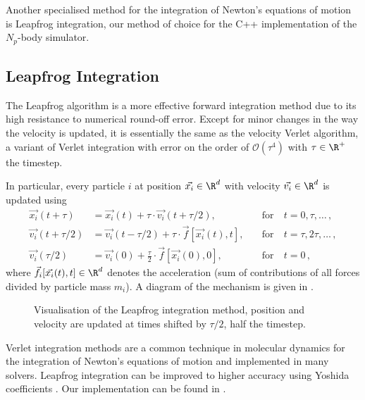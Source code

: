 Another specialised method for the integration of Newton's equations of motion is Leapfrog integration, our method of choice for the C++ implementation of the $N_p$-body simulator.

\subsection{Leapfrog Integration}
The Leapfrog algorithm is a more effective forward integration method due to its high resistance to numerical round-off error.
Except for minor changes in the way the velocity is updated, it is essentially the same as the velocity Verlet algorithm, a variant of Verlet integration with error on the order of $\mathcal{O}(\tau^4)$ with $\tau \in \R^+$ the timestep.

In particular, every particle $i$ at position $\vec{x_i} \in \R^d$ with velocity $\vec{v_i} \in \R^d$ is updated using
\begin{align*}
  \vec{x_i}(t+\tau)     & = \vec{x_i}(t)+\tau \cdot \vec{v_i}(t+\tau / 2),              & \quad\text{for}~ & t=0, \tau, \ldots\,,      \\
  \vec{v_i}(t+\tau / 2) & = \vec{v_i}(t-\tau/2) + \tau \cdot \vec{f}[\vec{x_i}(t), t],  & \quad\text{for}~ & t=\tau, 2 \tau, \ldots\,, \\
  \vec{v_i}(\tau / 2)   & = \vec{v_i}(0)+\frac{\tau}{2} \cdot \vec{f}[\vec{x_i}(0), 0], & \quad\text{for}~ & t=0\,,
\end{align*}
where $\vec{f_i}[\vec{x_i}(t), t] \in \R^d$ denotes the acceleration (sum of contributions of all forces divided by particle mass $m_i$).
A diagram of the mechanism is given in .

\begin{figure}[H]
  \centering
  \caption{Visualisation of the Leapfrog integration method, position and velocity are updated at times shifted by $\tau/2$, half the timestep.}
  \label{fig:leapfrog}
\end{figure}

Verlet integration methods are a common technique in molecular dynamics for the integration of Newton's equations of motion and implemented in many solvers.
Leapfrog integration can be improved to higher accuracy using Yoshida coefficients \parencite{1973-yoshida-coefficients}.
Our implementation can be found in .


